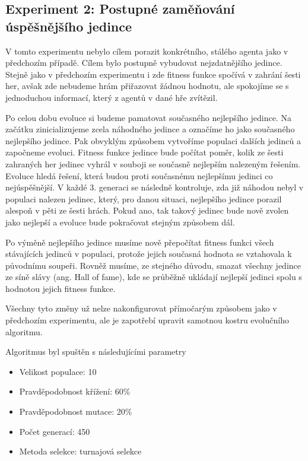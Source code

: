 \subsection{Experiment 2: Postupné zaměňování úspěšnějšího jedince}
V tomto experimentu nebylo cílem porazit konkrétního, stálého agenta jako v předchozím případě.
Cílem bylo postupně vybudovat nejzdatnějšího jedince.
Stejně jako v předchozím experimentu i zde fitness funkce spočívá v zahrání šesti her,
avšak zde nebudeme hrám přiřazovat žádnou hodnotu, ale spokojíme se s jednoduchou informací, který z agentů v dané hře zvítězil.
\par
Po celou dobu evoluce si budeme pamatovat současného nejlepšího jedince. 
Na začátku zinicializujeme zcela náhodného jedince a označíme ho jako současného nejlepšího jedince.
Pak obvyklým způsobem vytvoříme populaci dalších jedinců a započneme evoluci.
Fitness funkce jedince bude počítat poměr, kolik ze šesti zahraných her jedinec vyhrál v souboji se současně nejlepším nalezeným řešením.
Evoluce hledá řešení, která budou proti současnému nejlepšímu jedinci co nejúspěšnější.
V každé 3. generaci se následně kontroluje, zda již náhodou nebyl v populaci nalezen jedinec, který, pro danou situaci, nejlepšího jedince porazil alespoň v pěti ze šesti hrách.
Pokud ano, tak takový jedinec bude nově zvolen jako nejlepší a evoluce bude pokračovat stejným způsobem dál.
\par
Po výměně nejlepšího jedince musíme nově přepočítat fitness funkci všech stávajících jedinců v populaci, protože jejich současná hodnota se vztahovala k původnímu soupeři.
Rovněž musíme, ze stejného důvodu, smazat všechny jedince ze síně slávy (ang. Hall of fame), kde se průběžně ukládají nejlepší jedinci spolu s hodnotou jejich fitness funkce.

\par
Všechny tyto změny už nelze nakonfigurovat přímočarým způsobem jako v předchozím experimentu, ale je zapotřebí upravit samotnou kostru evolučního algoritmu.
\par
Algoritmus byl spuštěn s následujícími parametry
\begin{itemize}
    \item Velikost populace: 10
    \item Pravděpodobnost křížení: 60\%
    \item Pravděpodobnost mutace: 20\%
    \item Počet generací: 450
    \item Metoda selekce: turnajová selekce
\end{itemize}

